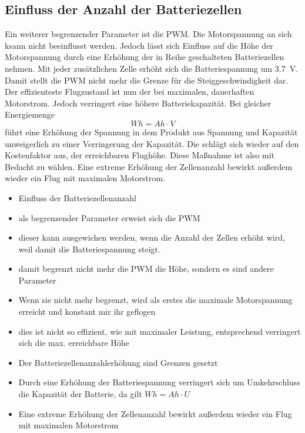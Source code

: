 \subsection{Einfluss der Anzahl der Batteriezellen}
Ein weiterer begrenzender Parameter ist die PWM. Die Motorspannung an sich ksann nicht beeinflusst werden. Jedoch lässt sich Einfluss auf die Höhe der Motorspannung durch eine Erhöhung der in Reihe geschalteten Batteriezellen nehmen. Mit jeder zusätzlichen Zelle erhöht sich die Batteriespannung um \SI{3,7}{V}. Damit stellt die PWM nicht mehr die Grenze für die Steiggeschwindigkeit dar. Der effizienteste Flugzustand ist nun der bei maximalen, dauerhaften Motorstrom. Jedoch verringert eine höhere Batteriekapazität. Bei gleicher Energiemenge 
\begin{equation}
	Wh = Ah\cdot V
\end{equation}
führt eine Erhöhung der Spannung in dem Produkt aus Spannung und Kapazität unweigerlich zu einer Verringerung der Kapazität. Die schlägt sich wieder auf den Kostenfaktor aus, der erreichbaren Flughöhe. Diese Maßnahme ist also mit Bedacht zu wählen. Eine extreme Erhöhung der Zellenanzahl bewirkt außerdem wieder ein Flug mit maximalen Motorstrom.

\begin{itemize}
	\item Einfluss der Batteriezellenanzahl
	\item als begrenzender Parameter erweist sich die PWM
	\item dieser kann ausgewichen werden, wenn die Anzahl der Zellen erhöht wird, weil damit die Batteriespannung steigt. 
	\item damit begrenzt nicht mehr die PWM die Höhe, sondern es sind andere Parameter
	\item Wenn sie nicht mehr begrenzt, wird als erstes die maximale Motorspannung erreicht und konstant mir ihr geflogen
	\item dies ist nicht so effizient, wie mit maximaler Leistung, entsprechend verringert sich die max. erreichbare Höhe
	\item Der Batteriezellenanzahlerhöhung sind Grenzen gesetzt
	\item Durch eine Erhöhung der Batteriespannung verringert sich um Umkehrschluss die Kapazität der Batterie, da gilt \ensuremath{Wh = Ah\cdot U}
	\item Eine extreme Erhöhung der Zellenanzahl bewirkt außerdem wieder ein Flug mit maximalen Motorstrom
\end{itemize}

